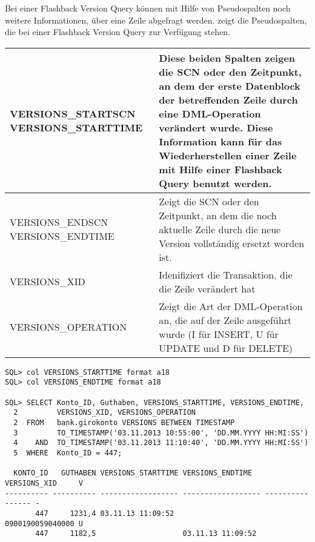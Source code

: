       Bei einer Flashback Version Query können mit Hilfe von Pseudospalten noch weitere Informationen, über eine Zeile abgefragt werden.  zeigt die Pseudospalten, die bei einer Flashback Version Query zur Verfügung stehen.
      \begin{center}
        \tablehead{%
        }
        \tabletail{%
          \hline
        }
        \begin{supertabular}[h]{|p{5cm}|p{9,5cm}|}
          \label{flashtable1}
          \raggedright VERSIONS\_STARTSCN VERSIONS\_STARTTIME & \footnotesize Diese beiden Spalten zeigen die SCN oder den Zeitpunkt, an dem der erste Datenblock der betreffenden Zeile durch eine DML-Operation verändert wurde. Diese Information kann für das Wiederherstellen einer Zeile mit Hilfe einer Flashback Query benutzt werden. \\
          \hline
          \raggedright VERSIONS\_ENDSCN VERSIONS\_ENDTIME & \footnotesize Zeigt die SCN oder den Zeitpunkt, an dem die noch aktuelle Zeile durch die neue Version vollständig ersetzt worden ist. \\
          \hline
          VERSIONS\_XID & \footnotesize Idenifiziert die Transaktion, die die Zeile verändert hat \\
          \hline
          VERSIONS\_OPERATION & \footnotesize Zeigt die Art der DML-Operation an, die auf der Zeile ausgeführt wurde (I für  INSERT, U für UPDATE und D für DELETE)\\
        \end{supertabular}
      \end{center}
      \begin{lstlisting}[caption={Informationsgewinnung mit Flashback Version Query},label=admin1702,language=oracle_sql,alsolanguage=sqlplus]
SQL> col VERSIONS_STARTTIME format a18 
SQL> col VERSIONS_ENDTIME format a18

SQL> SELECT Konto_ID, Guthaben, VERSIONS_STARTTIME, VERSIONS_ENDTIME,
  2         VERSIONS_XID, VERSIONS_OPERATION
  2  FROM   bank.girokonto VERSIONS BETWEEN TIMESTAMP
  3         TO_TIMESTAMP('03.11.2013 10:55:00', 'DD.MM.YYYY HH:MI:SS')
  4    AND  TO_TIMESTAMP('03.11.2013 11:10:40', 'DD.MM.YYYY HH:MI:SS')
  5  WHERE  Konto_ID = 447;

  KONTO_ID   GUTHABEN VERSIONS_STARTTIME VERSIONS_ENDTIME   VERSIONS_XID     V
---------- ---------- ------------------ ------------------ ---------------- -
       447     1231,4 03.11.13 11:09:52                     0900190059040000 U
       447     1182,5                    03.11.13 11:09:52
      \end{lstlisting}
      \begin{literaturinternet}
        \item \cite{ADFNS01004}
      \end{literaturinternet}

